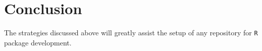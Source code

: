 \documentclass{article}
\begin{document}
\section{Conclusion} 
\label{sec:conclusion}

The strategies discussed above will greatly assist the setup of any repository 
for \texttt{R} package development.




% 
\end{document}
